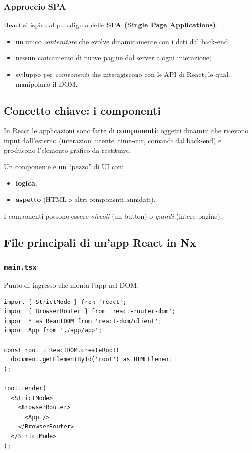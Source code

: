 \documentclass[11pt,a4paper]{article}
\begin{document}
\subsubsection{Approccio SPA}
React si ispira al paradigma delle \textbf{SPA (Single Page Applications)}:
\begin{itemize}[leftmargin=*]
    \item un unico \emph{contenitore} che evolve dinamicamente con i dati dal back-end;
    \item nessun caricamento di nuove pagine dal server a ogni interazione;
    \item sviluppo per \emph{componenti} che interagiscono con le API di React, le quali manipolano il DOM.
\end{itemize}

\subsection{Concetto chiave: i componenti}

In React le applicazioni sono fatte di \textbf{componenti}: oggetti dinamici che ricevono input dall'esterno (interazioni utente, time-out, comandi dal back-end) e producono l'elemento grafico da restituire.

Un componente \`e un ``pezzo'' di UI con:
\begin{itemize}[leftmargin=*]
    \item \textbf{logica};
    \item \textbf{aspetto} (HTML o altri componenti annidati).
\end{itemize}

I componenti possono essere \emph{piccoli} (un button) o \emph{grandi} (intere pagine).

\subsection{File principali di un'app React in Nx}

\subsubsection{\texttt{main.tsx}}
Punto di ingresso che monta l'app nel DOM:

\begin{lstlisting}[language=tsx]
import { StrictMode } from 'react';
import { BrowserRouter } from 'react-router-dom';
import * as ReactDOM from 'react-dom/client';
import App from './app/app';

const root = ReactDOM.createRoot(
  document.getElementById('root') as HTMLElement
);

root.render(
  <StrictMode>
    <BrowserRouter>
      <App />
    </BrowserRouter>
  </StrictMode>
);
\end{lstlisting}
\end{document}
